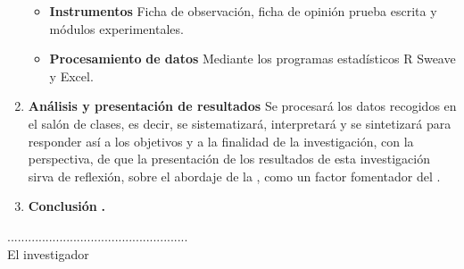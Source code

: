 \documentclass[12pt,a4paper]{article}
\begin{document}
\begin{enumerate}
\begin{itemize}
		      \item \textbf{Instrumentos} Ficha de observación, ficha de opinión prueba
		            escrita y módulos experimentales.
		      \item \textbf{Procesamiento} \textbf{de datos} Mediante los programas estadísticos R Sweave y Excel.
	      \end{itemize}
	\item \textbf{Análisis y presentación de resultados} Se procesará los datos
	      recogidos en el salón de clases, es decir, se sistematizará, interpretará
	      y se sintetizará para responder así a los objetivos y a la finalidad
	      de la investigación, con la perspectiva, de que la presentación de
	      los resultados de esta investigación sirva de reflexión, sobre el
	      abordaje de la \MakeTextLowercase{\variablei}, como un factor
	      fomentador del \MakeTextLowercase{\variabled}.
	\item \textbf{Conclusión }\hipotesis\textbf{.}
\end{enumerate}
\textbf{\vspace{0.5cm}
}
\begin{center}
	....................................................\\
	El investigador
\end{center}

\clearpage
\end{document}

